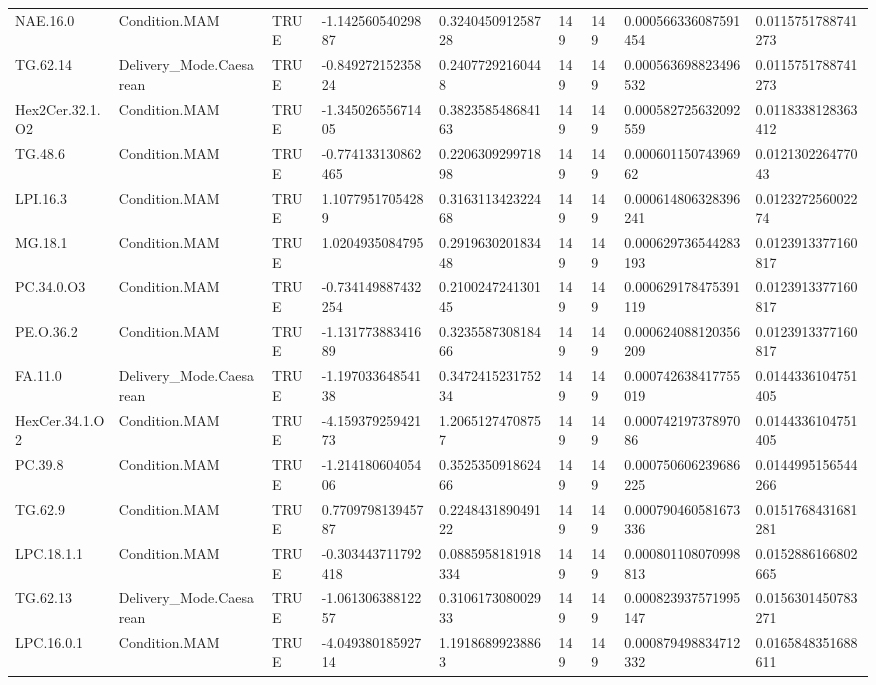 \begin{longtable}{lllllllll}
NAE.16.0 & Condition.MAM & TRUE & -1.14256054029887 & 0.324045091258728 & 149 & 149 & 0.000566336087591454 & 0.0115751788741273 \\
TG.62.14 & Delivery\_Mode.Caesarean & TRUE & -0.84927215235824 & 0.24077292160448 & 149 & 149 & 0.000563698823496532 & 0.0115751788741273 \\
Hex2Cer.32.1.O2 & Condition.MAM & TRUE & -1.34502655671405 & 0.382358548684163 & 149 & 149 & 0.000582725632092559 & 0.0118338128363412 \\
TG.48.6 & Condition.MAM & TRUE & -0.774133130862465 & 0.220630929971898 & 149 & 149 & 0.00060115074396962 & 0.012130226477043 \\
LPI.16.3 & Condition.MAM & TRUE & 1.10779517054289 & 0.316311342322468 & 149 & 149 & 0.000614806328396241 & 0.012327256002274 \\
MG.18.1 & Condition.MAM & TRUE & 1.0204935084795 & 0.291963020183448 & 149 & 149 & 0.000629736544283193 & 0.0123913377160817 \\
PC.34.0.O3 & Condition.MAM & TRUE & -0.734149887432254 & 0.210024724130145 & 149 & 149 & 0.000629178475391119 & 0.0123913377160817 \\
PE.O.36.2 & Condition.MAM & TRUE & -1.13177388341689 & 0.323558730818466 & 149 & 149 & 0.000624088120356209 & 0.0123913377160817 \\
FA.11.0 & Delivery\_Mode.Caesarean & TRUE & -1.19703364854138 & 0.347241523175234 & 149 & 149 & 0.000742638417755019 & 0.0144336104751405 \\
HexCer.34.1.O2 & Condition.MAM & TRUE & -4.15937925942173 & 1.20651274708757 & 149 & 149 & 0.00074219737897086 & 0.0144336104751405 \\
PC.39.8 & Condition.MAM & TRUE & -1.21418060405406 & 0.352535091862466 & 149 & 149 & 0.000750606239686225 & 0.0144995156544266 \\
TG.62.9 & Condition.MAM & TRUE & 0.770979813945787 & 0.224843189049122 & 149 & 149 & 0.000790460581673336 & 0.0151768431681281 \\
LPC.18.1.1 & Condition.MAM & TRUE & -0.303443711792418 & 0.0885958181918334 & 149 & 149 & 0.000801108070998813 & 0.0152886166802665 \\
TG.62.13 & Delivery\_Mode.Caesarean & TRUE & -1.06130638812257 & 0.310617308002933 & 149 & 149 & 0.000823937571995147 & 0.0156301450783271 \\
LPC.16.0.1 & Condition.MAM & TRUE & -4.04938018592714 & 1.19186899238863 & 149 & 149 & 0.000879498834712332 & 0.0165848351688611 \\

\end{longtable}
